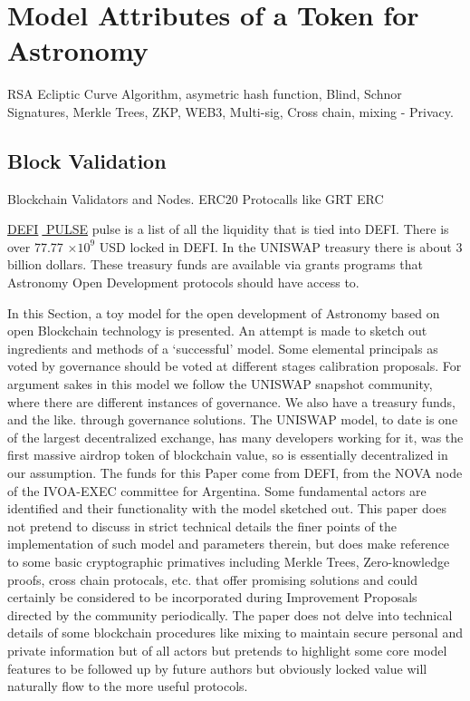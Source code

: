 \documentclass[final,5p,times,twocolumn,authoryear]{elsarticle}
\begin{document}
 \section{Model Attributes of a Token for Astronomy}
\label{sec:btc4}
RSA Ecliptic Curve Algorithm, asymetric hash function, Blind, Schnor Signatures, Merkle Trees, ZKP,  WEB3, Multi-sig, Cross chain, mixing - Privacy. 

\subsection{Block Validation}
\label{subsec: validator}
Blockchain Validators and Nodes. ERC20 Protocalls like GRT ERC   

\href{https://defipulse.com/}{DEFI$\;$ PULSE} pulse is a list of all the liquidity that is tied into DEFI. There is over 77.77 $\times 10^{9}$ USD locked in DEFI. In the UNISWAP treasury there is about 3 billion dollars. These treasury funds are available via grants programs that Astronomy Open Development protocols should have access to.

In this Section, a toy model for the open development of Astronomy based on open Blockchain technology is presented. An attempt is made to sketch out ingredients and methods of a `successful' model. Some elemental principals as voted by governance should be voted at different stages calibration proposals. For argument sakes in this model we follow the UNISWAP snapshot community, where there are different instances of governance. We also have a treasury funds, and the like.  through governance solutions. The UNISWAP model, to date is one of the largest decentralized exchange, has many developers working for it, was the first massive airdrop token of blockchain value, so is essentially decentralized in our assumption. The funds for this Paper come from DEFI, from the NOVA node of the IVOA-EXEC committee for Argentina. Some fundamental actors are identified and their functionality with the model sketched out. This paper does not pretend to discuss in strict technical details the finer points of the implementation of such model and parameters therein, but does make reference to some basic cryptographic primatives including Merkle Trees, Zero-knowledge proofs, cross chain protocals, etc. that offer promising solutions and could certainly be considered to be incorporated during Improvement Proposals directed by the community periodically. The paper does not delve into technical details of some blockchain procedures like mixing to maintain secure personal and private information but of all actors but pretends to highlight some core model features to be followed up by future authors but obviously  locked value will naturally flow to the more useful protocols.  
 
\end{document}
